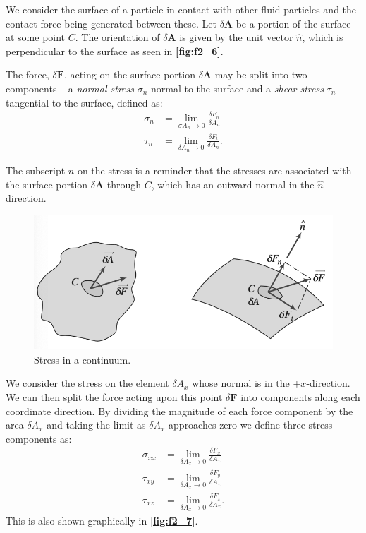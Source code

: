 We consider the surface of a particle in contact with other fluid particles and the contact force being generated between these. Let $\delta \textbf{A}$ be a portion of the surface at some point $C$. The orientation of $\delta \textbf{A}$ is given by the unit vector $\hat{n}$, which is perpendicular to the surface as seen in \textbf{\autoref{fig:f2_6}}.

The force, $\delta \textbf{F}$, acting on the surface portion $\delta \textbf{A}$ may be split into two components -- a \textit{normal stress} $\sigma_n$ normal to the surface and a \textit{shear stress} $\tau_n$ tangential to the surface, defined as:
\begin{align*}
  \sigma_n &= \lim_{\sigma A_n \to 0} \frac{\delta F_n}{\delta A_n} \\
  \tau_n &= \lim_{\delta A_n \to 0} \frac{\delta F_t}{\delta A_n}
.\end{align*}

The subscript $n$ on the stress is a reminder that the stresses are associated with the surface portion $\delta \textbf{A}$ through $C$, which has an outward normal in the $\hat{n}$ direction. 

\begin{figure} [ht]
  \centering
  \includegraphics[width=0.5\linewidth]{./figures/f2_6.png}
  \caption{Stress in a continuum.}
  \label{fig:f2_6}
\end{figure}

We consider the stress on the element $\delta A_x$ whose normal is in the $+x$-direction. We can then split the force acting upon this point $\delta \textbf{F}$ into components along each coordinate direction. By dividing the magnitude of each force component by the area $\delta A_x$ and taking the limit as $\delta A_x$ approaches zero we define three stress components as:
\begin{align*}
  \sigma_{ x x} &= \lim_{\delta A_x \to 0} \frac{\delta F_x}{\delta A_x} \\
  \tau_{xy} &= \lim_{\delta A_x \to 0} \frac{\delta F_y}{\delta A_x} \\
  \tau_{xz} &= \lim_{\delta A_x \to 0} \frac{\delta F_z}{\delta A_x}
.\end{align*}
This is also shown graphically in \textbf{\autoref{fig:f2_7}}.

